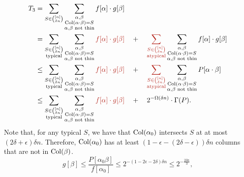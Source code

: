 \begin{align*}
  T_3 & = \sum_{S \in \binom{[n]}{\delta n}} \sum_{\substack{\alpha, \beta\\ \Col(\alpha \cdot \beta) = S \\ \text{$\alpha$,$\beta$ not thin}}} f[\alpha] \cdot g[\beta]\\
      & = \sum_{\substack{S \in \binom{[n]}{\delta n}\\\text{typical}}} \sum_{\substack{\alpha, \beta\\ \Col(\alpha \cdot \beta) = S \\ \text{$\alpha$,$\beta$ not thin}}} \textcolor{BrickRed}{f[\alpha] \cdot g[\beta]}  \quad+\quad \textcolor{BrickRed}{\sum_{\substack{S \in \binom{[n]}{\delta n}\\\text{atypical}}}} \sum_{\substack{\alpha, \beta\\ \Col(\alpha \cdot \beta) = S \\ \text{$\alpha$,$\beta$ not thin}}} f[\alpha] \cdot g[\beta]\\
      & \leq \sum_{\substack{S \in \binom{[n]}{\delta n}\\\text{typical}}} \sum_{\substack{\alpha, \beta\\ \Col(\alpha \cdot \beta) = S \\ \text{$\alpha$,$\beta$ not thin}}} \textcolor{BrickRed}{f[\alpha] \cdot g[\beta]}  \quad+\quad \textcolor{BrickRed}{\sum_{\substack{S \in \binom{[n]}{\delta n}\\\text{atypical}}}} \sum_{\substack{\alpha, \beta\\ \Col(\alpha \cdot \beta) = S \\ \text{$\alpha$,$\beta$ not thin}}} P[\alpha \cdot \beta]\\
  & \leq \sum_{\substack{S \in \binom{[n]}{\delta n}\\\text{typical}}} \sum_{\substack{\alpha, \beta\\ \Col(\alpha \cdot \beta) = S \\ \text{$\alpha$,$\beta$ not thin}}} \textcolor{BrickRed}{f[\alpha] \cdot g[\beta]}  \quad+\quad 2^{-\Omega(\delta n)} \cdot \Gamma(P).
\end{align*}
Note that, for any typical $S$, we have that $\operatorname{Col}(\alpha_0)$ intersects $S$ at at most $(2\delta + \epsilon)\delta n$. Therefore, $\operatorname{Col}(\alpha_0)$ has at least $(1 - \epsilon - (2\delta - \epsilon))\delta n$ columns that are not in $\operatorname{Col}(\beta)$.
\[
  g[\beta] \leq \frac{P[\alpha_0 \beta]}{f[\alpha_0]} \leq 2^{-(1 - 2\epsilon - 2\delta)\delta n} \leq 2^{-\frac{2\delta n}{3}},
\]
